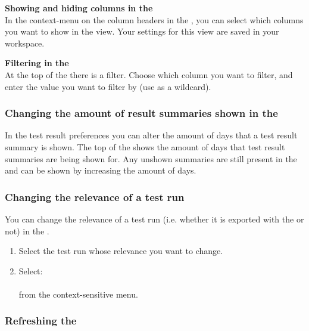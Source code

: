 \textbf{Showing and hiding columns in the \gdtestsummaryview}\\

In the context-menu on the column headers in the \gdtestsummaryview{}, you can select which columns you want to show in the view. Your settings for this view are saved in your workspace. 

\textbf{Filtering in the \gdtestsummaryview}\\

At the top of the \gdtestsummaryview{} there is a filter. Choose which column you want to filter, and enter the value you want to filter by (use \bxshell{*} as a wildcard). 

\subsubsection{Changing the amount of result summaries shown in the \gdtestsummaryview{}}

In the test result preferences  you can alter the amount of days that a test result summary is shown. The top of the \gdtestsummaryview{} shows the amount of days that test result summaries are being shown for. Any unshown summaries are still present in the \gddb{} and can be shown by increasing the amount of days. 

\subsubsection{Changing the relevance of a test run}
\label{TasksChangeRelevance}
You can change the relevance of a test run (i.e. whether it is exported with the \gdproject{} or not) in the \gdtestsummaryview{}.
\begin{enumerate}
\item Select the test run whose relevance you want to change.
\item Select:\\
\\
from the context-sensitive menu.
\end{enumerate}

\subsubsection{Refreshing the \gdtestsummaryview{}}
\label{TasksRefreshSummaryView}

